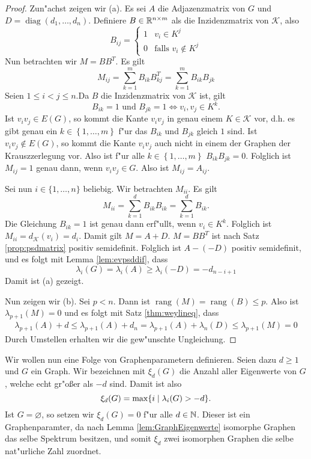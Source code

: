 \begin{proof}
  Zun"achst zeigen wir (a). Es sei $A$ die Adjazenzmatrix von $G$ und $D = \operatorname{diag}(d_1,\dots,d_n)$. Definiere $B\in{\mathbb{R}}^{n\times m}$ als die Inzidenzmatrix von $\mathcal K$, also $$B_{ij} = \begin{cases}
    1 & v_i \in K^j \\ 0 & \text{falls }v_i \notin K^j
  \end{cases}$$ 
  Nun betrachten wir $M=BB^{T}$. Es gilt
  \[
    M_{ij} = \sum\limits_{k=1}^{m}B_{ik}B^{T}_{kj} = \sum\limits_{k=1}^{m}B_{ik}B_{jk}
  \]
  Seien $1\leq i < j \leq n$.Da $B$ die Inzidenzmatrix von $\mathcal{K}$ ist, gilt  $$ B_{ik} = 1 \text{ und } B_{jk} = 1 \Leftrightarrow v_i,v_j \in K^{k}.$$ Ist $v_iv_j \in E(G)$, so kommt die Kante $v_iv_j$ in genau einem $K\in \mathcal{K}$ vor, d.h. es gibt genau ein $k\in \left\{ 1,\dots,m \right\}$ f"ur das $B_{ik}$ und $B_{jk}$ gleich $1$ sind. Ist $v_iv_j\notin E(G)$, so kommt die Kante $v_iv_j$ auch nicht in einem der Graphen der Krauszzerlegung vor.
  Also ist f"ur alle $k\in \left\{ 1,\dots, m \right\}$ $B_{ik}B_{jk} = 0$. Folglich ist $M_{ij}=1$ genau dann, wenn $v_iv_j\in G$. Also ist $M_{ij} = A_{ij}$.

  Sei nun $i\in\{1,\dots,n\}$ beliebig. Wir betrachten $M_{ii}$. Es gilt 
  \[
    M_{ii} = \sum\limits_{k=1}^{d}B_{ik}B_{ik} = \sum\limits_{k=1}^{d} B_{ik}.
  \]
  Die Gleichung $B_{ik}=1$ ist genau dann erf"ullt, wenn $v_i \in K^k$. Folglich ist $M_{ii}= d_{\mathcal{K}}(v_i)= d_i$. Damit gilt $M=A+D$. $M=BB^{T}$ ist nach Satz \ref{prop:psdmatrix} positiv semidefinit.
  Folglich ist $A- (-D)$ positiv semidefinit, und es folgt mit Lemma \ref{lem:evpsddif}, dass 
  \begin{equation*}
    \lambda_i(G) = \lambda_i(A) \geq \lambda_i(-D) = -d_{n-i+1}
  \end{equation*}
  Damit ist (a) gezeigt.

  Nun zeigen wir (b). Sei $p<n$. Dann ist $\operatorname{rang}(M)= \operatorname{rang}(B) \leq p$. Also ist $\lambda_{p+1}(M) = 0$ und es folgt mit Satz \ref{thm:weylineq}, dass 
  \begin{align*}
    \lambda_{p+1}(A) + d \leq \lambda_{p+1}(A) + d_{n} = \lambda_{p+1}(A) + \lambda_{n} (D) \leq \lambda_{p+1} (M) = 0
  \end{align*}
  Durch Umstellen erhalten wir die gew"unschte Ungleichung.
\end{proof}

Wir wollen nun eine Folge von Graphenparametern definieren. Seien dazu $d\geq 1$ und $G$ ein Graph. Wir bezeichnen mit $\xi_{d}(G)$ die Anzahl aller Eigenwerte von $G$, welche echt gr"o{\ss}er als $-d$ sind. Damit ist also 
$$\xi_{d}(G) = \max \{i \;|\; \lambda_i(G) > -d \}.$$
Ist $G=\varnothing$, so setzen wir $\xi_{d}(G) = 0$ f"ur alle $d\in{\mathbb{N}}$.
Dieser ist ein Graphenparamter, da nach Lemma \ref{lem:GraphEigenwerte} isomorphe Graphen das selbe Spektrum besitzen, und somit $\xi_d $ zwei isomorphen Graphen die selbe nat"urliche Zahl zuordnet. 

